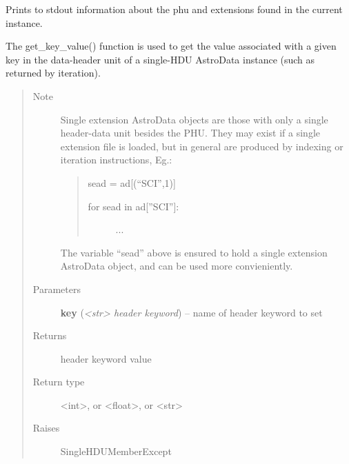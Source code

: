 \documentclass[letterpaper,10pt,english]{sphinxmanual}
\begin{document}
\begin{fulllineitems}
\begin{fulllineitems}
\label{astro_class:astrodata.AstroData.AstroData.info}
Prints to stdout information about the phu and extensions found 
in the current instance.

\end{fulllineitems}


\begin{fulllineitems}
\label{astro_class:astrodata.AstroData.AstroData.get_key_value}
The get\_key\_value() function is used to get the value associated
with a given key in the data-header unit of a single-HDU
AstroData instance (such as returned by iteration).
\begin{quote}\begin{description}
\item[{Note }] \leavevmode
Single extension AstroData objects are those with only a single
header-data unit besides the PHU.  They may exist if a single
extension file is loaded, but in general are produced by indexing or
iteration instructions, Eg.:
\begin{quote}

sead = ad{[}(``SCI'',1){]}
\begin{description}
\item[{for sead in ad{[}''SCI''{]}:}] \leavevmode
...

\end{description}
\end{quote}

The variable ``sead'' above is ensured to hold a single extension
AstroData object, and can be used more convieniently.

\item[{Parameters}] \leavevmode
\textbf{key} (\emph{\textless{}str\textgreater{} header keyword}) -- name of header keyword to set

\item[{Returns}] \leavevmode
header keyword value

\item[{Return type}] \leavevmode
\textless{}int\textgreater{}, or \textless{}float\textgreater{}, or \textless{}str\textgreater{}

\item[{Raises }] \leavevmode
SingleHDUMemberExcept


\end{description}
\end{quote}
\end{fulllineitems}
\end{fulllineitems}
\end{document}
